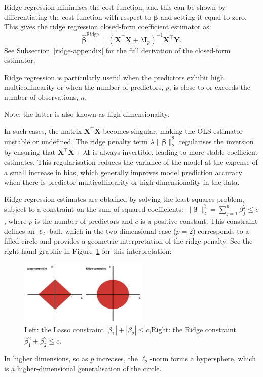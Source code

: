 \documentclass[11pt]{report} %
\begin{document}
Ridge regression minimises the cost function, and this can be shown by differentiating the cost function with respect to $\boldsymbol{\beta}$ and setting it equal to zero. This gives the ridge regression closed-form coefficient estimator as: 
\begin{equation}
\boldsymbol{\hat{\beta}}^{\text{Ridge}} = \left( \mathbf{X}^\top \mathbf{X} + \lambda \mathbf{I}_p \right)^{-1} \mathbf{X}^\top \mathbf{Y}.
\label{closed-form}
\end{equation} 
See Subsection~\ref{ridge-appendix} for the full derivation of the closed-form estimator.

Ridge regression is particularly useful when the predictors exhibit high multicollinearity or when the number of predictors, \( p \), is close to or exceeds the number of observations, \( n \). 

\noindent Note: the latter is also known as high-dimensionality.

In such cases, the matrix \( \mathbf{X}^\top \mathbf{X} \) becomes singular, making the OLS estimator unstable or undefined. The ridge penalty term \( \lambda \| \boldsymbol{\beta} \|_2^2 \) regularises the inversion by ensuring that \( \mathbf{X}^\top \mathbf{X} + \lambda \mathbf{I} \) is always invertible, leading to more stable coefficient estimates. This regularisation reduces the variance of the model at the expense of a small increase in bias, which generally improves model prediction accuracy when there is predictor multicollinearity or high-dimensionality in the data.

\noindent Ridge regression estimates are obtained by solving the least squares problem, subject to a constraint on the sum of squared coefficients: $\| \boldsymbol{\beta} \|_2^2=\sum_{j=1}^p \beta_j^2 \leq c$, where $p$ is the number of predictors and $c$ is a positive constant. This constraint defines an \( \ell_2 \)-ball, which in the two-dimensional case (\( p = 2 \)) corresponds to a filled circle and provides a geometric interpretation of the ridge penalty. See the right-hand graphic in Figure~\ref{fig:ridge-lasso-geom} for this interpretation:
\begin{figure}[H]
    \centering
    \includegraphics[width=0.55\textwidth]{Images/Ridge Lasso Geom.png}
    \caption{Left: the Lasso constraint \( |\beta_1| + |\beta_2| \leq c \),\quad Right: the Ridge constraint \( \beta_1^2 + \beta_2^2 \leq c \).}
    \label{fig:ridge-lasso-geom}
\end{figure}
\noindent In higher dimensions, so as $p$ increases, the \( \ell_2 \)-norm forms a hypersphere, which is a higher-dimensional generalisation of the circle. 
\end{document}
